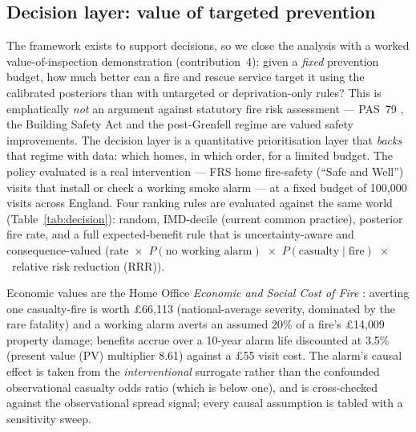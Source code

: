 \subsection{Decision layer: value of targeted prevention}
\label{sec:results-decision}

The framework exists to support decisions, so we close the analysis with a worked
value-of-inspection demonstration (contribution~4): given a \emph{fixed} prevention
budget, how much better can a fire and rescue service target it using the calibrated
posteriors than with untargeted or deprivation-only rules? This is emphatically
\emph{not} an argument against statutory fire risk assessment --- PAS~79
\citep{pas79_1_2020}, the Building Safety Act and the post-Grenfell regime are valued
safety improvements. The decision layer is a quantitative prioritisation layer that
\emph{backs} that regime with data: which homes, in which order, for a limited
budget. The policy evaluated is a real intervention --- FRS home fire-safety
(``Safe and Well'') visits that install or check a working smoke alarm --- at a fixed
budget of 100{,}000 visits across England. Four ranking rules are evaluated against
the same world (Table~\ref{tab:decision}): random, IMD-decile (current common
practice), posterior fire rate, and a full expected-benefit rule that is
uncertainty-aware and consequence-valued (rate~$\times$~$P(\text{no working
alarm})$~$\times$~$P(\text{casualty}\mid\text{fire})$~$\times$~relative risk
reduction (RRR)).

Economic values are the Home Office \emph{Economic and Social Cost of Fire}
\citep{homeoffice2023costfire}: averting one casualty-fire is worth \pounds66{,}113
(national-average severity, dominated by the rare fatality) and a working alarm
averts an assumed 20\% of a fire's \pounds14{,}009 property damage; benefits accrue
over a 10-year alarm life discounted at 3.5\% (present value (PV) multiplier 8.61)
against a \pounds55 visit cost. The alarm's causal effect is taken from the
\emph{interventional} surrogate rather than the confounded observational casualty
odds ratio (which is below one), and is cross-checked against the observational
spread signal; every causal assumption is tabled with a sensitivity sweep.

